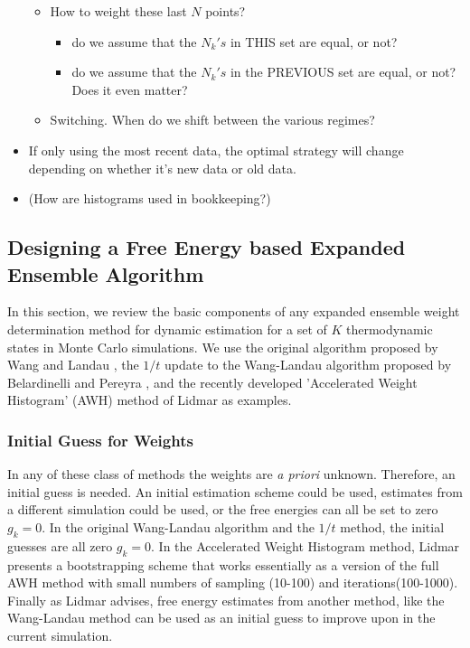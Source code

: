 \documentclass[superscriptaddress,showkeys, nofootinbib, pre, aps]{revtex4-1}
\begin{document}
\begin{itemize}
\begin{itemize}
    \item How to weight these last $N$ points?
     \begin{itemize} 
       \item do we assume that the $N_k's$ in THIS set are equal, or not?
       \item do we assume that the $N_k's$ in the PREVIOUS set are equal, or not?  Does it even matter?
     \end{itemize}
  \item Switching.  When do we shift between the various regimes?
\end{itemize}
\item If only using the most recent data, the optimal strategy will change
depending on whether it's new data or old data.

\item (How are histograms used in bookkeeping?)
\end{itemize}
\fi

\subsection{\label{sec:design}Designing a Free Energy based Expanded Ensemble Algorithm}
In this section, we review the basic components of any expanded ensemble weight determination method for dynamic estimation for a set of $K$ thermodynamic states in Monte Carlo simulations.  We use the original algorithm proposed by Wang and Landau \cite{wang-landau:prl:2001:wang-landau}, the $1/t$ update to the Wang-Landau algorithm proposed by Belardinelli and Pereyra \cite{Belardinelli2008}, and the recently developed 'Accelerated Weight Histogram' (AWH) method of Lidmar \cite{Lidmar2012} as examples.

\subsubsection{Initial Guess for Weights}
In any of these class of methods the weights are \emph{a priori} unknown.  Therefore, an initial guess is needed.  An initial estimation scheme could be used, estimates from a different simulation could be used, or the free energies can all be set to zero $g_k = 0$.  In the original Wang-Landau algorithm and the $1/t$ method, the initial guesses are all zero $g_k = 0$.  In the Accelerated Weight Histogram method, Lidmar presents a bootstrapping scheme that works essentially as a version of the full AWH method with small numbers of sampling (10-100) and iterations(100-1000).  Finally as Lidmar advises, free energy estimates from another method, like the Wang-Landau method can be used as an initial guess to improve upon in the current simulation.
\end{document}
